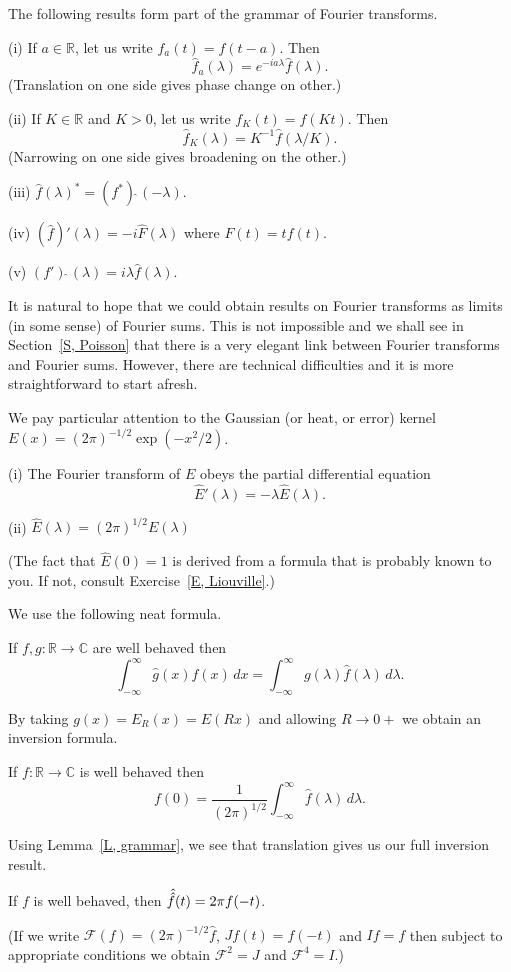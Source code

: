 The following results form part of the grammar of
Fourier transforms.
\begin{lemma}\label{L, grammar}
(i) If $a\in{\mathbb R}$, let us write
$f_{a}(t)=f(t-a)$. Then
\[\hat{f}_{a}(\lambda)=e^{-ia\lambda}\hat{f}(\lambda).\]
(Translation on one side gives phase change on other.)

(ii) If $K\in{\mathbb R}$ and $K>0$, let us write
$f_{K}(t)=f(Kt)$. Then
\[\hat{f}_{K}(\lambda)=K^{-1}\hat{f}(\lambda/K).\]
(Narrowing on one side gives broadening on the other.)

(iii) $\hat{f}(\lambda)^{*}=(f^{*})\hat{\ }(-\lambda)$.

(iv) $(\hat{f})'(\lambda)
=-i\hat{F}(\lambda)$ where $F(t)=tf(t)$.

(v) $(f')\hat{\ }(\lambda)=i\lambda\hat{f}(\lambda)$.
\end{lemma}

It is natural to hope that we could obtain results on Fourier
transforms as limits (in some sense) of Fourier sums.
This is not impossible and we shall see in Section~\ref{S, Poisson}
that there is a very elegant link between Fourier
transforms and Fourier sums. However, there are technical
difficulties and it is more straightforward to start afresh.

We pay particular attention to the Gaussian (or heat, or error)
kernel $E(x)=(2\pi)^{-1/2}\exp(-x^{2}/2)$.
\begin{lemma}\label{L, Fourier of Gauss}
(i) The Fourier transform of $E$ obeys the partial differential
equation
\[\hat{E}'(\lambda)=-\lambda\hat{E}(\lambda).\]

(ii) $\hat{E}(\lambda)=(2\pi)^{1/2}E(\lambda)$
\end{lemma}
(The fact that $\hat{E}(0)=1$ is derived from a formula
that is probably known to you. If not, consult
Exercise~\ref{E, Liouville}.)

We use the following neat formula.
\begin{lemma}\label{L neat} If $f,g:{\mathbb R}\rightarrow{\mathbb C}$
are well behaved then
\[\int_{-\infty}^{\infty}\hat{g}(x)f(x)\,dx
=\int_{-\infty}^{\infty}g(\lambda)\hat{f}(\lambda)\,d\lambda.\]
\end{lemma}

By taking $g(x)=E_{R}(x)=E(Rx)$ and allowing $R\rightarrow 0+$
we obtain an inversion formula.
\begin{lemma}\label{L start inversion}
If $f:{\mathbb R}\rightarrow{\mathbb C}$
is well behaved then
\[f(0)=\frac{1}{(2\pi)^{1/2}}
\int_{-\infty}^{\infty}\hat{f}(\lambda)\,d\lambda.\]
\end{lemma}
Using Lemma~\ref{L, grammar}, we see that translation gives us
our full inversion result.
\begin{theorem}\label{T, inversion transform}
If $f$ is well behaved,
then $\Hat{\Hat{f}}(t)=2\pi f(-t)$.
\end{theorem}
(If we write ${\mathcal F}(f)=(2\pi)^{-1/2}\hat{f}$, $Jf(t)=f(-t)$
and $If=f$ then subject to appropriate conditions we obtain
${\mathcal F}^{2}=J$ and ${\mathcal F}^{4}=I$.)

